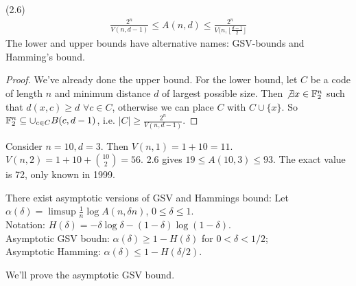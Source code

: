 \documentclass[a4paper]{article}
\begin{document}
\begin{prop} (2.6)\\
\begin{equation*}
\begin{aligned}
\frac{2^n}{V(n,d-1)} \leq A(n,d) \leq \frac{2^n}{V(n,\lfloor \frac{d-1}{2} \rfloor}
\end{aligned}
\end{equation*}
The lower and upper bounds have alternative names: GSV-bounds and Hamming's bound.
\begin{proof}
We've already done the upper bound. For the lower bound, let $C$ be a code of length $n$ and minimum distance $d$ of largest possible size. Then $\not\exists x \in \mathbb{F}_2^n$ such that $d(x,c) \geq d$ $\forall c \in C$, otherwise we can place $C$ with $C \cup \{x\}$. So $\mathbb{F}_2^n \subseteq \cup_{c \in C} B(c,d-1)$, i.e. $|C| \geq \frac{2^n}{V(n,d-1)}$.
\end{proof}
\end{prop}

\begin{eg}
Consider $n=10,d=3$. Then $V(n,1) = 1+10=11$. $V(n,2) = 1+10+{10 \choose 2} = 56$. 2.6 gives $19 \leq A(10,3) \leq 93$. The exact value is 72, only known in 1999.
\end{eg}

There exist asymptotic versions of GSV and Hammings bound: Let $\alpha(\delta) = \limsup\frac{1}{n} \log A(n,\delta n)$, $0 \leq \delta \leq 1$.\\
Notation: $H(\delta) = -\delta\log\delta - (1-\delta) \log(1-\delta)$.\\
Asymptotic GSV boudn: $\alpha(\delta) \geq 1-H(\delta)$ for $0 < \delta < 1/2$;\\
Asymptotic Hamming: $\alpha(\delta) \leq 1-H(\delta/2)$.

We'll prove the asymptotic GSV bound.
\end{document}
